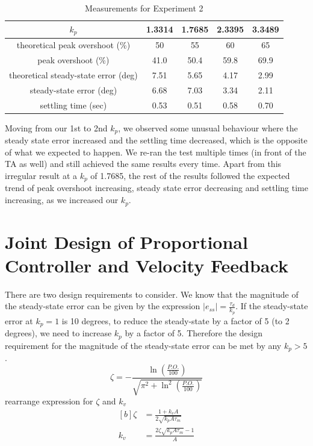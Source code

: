 \documentclass[12pt]{article}
\begin{document}

\begin{table}[h!]
\centering
\begin{tabular}{|c|c|c|c|c|} \hline
    $k_p$ & 1.3314 & 1.7685 & 2.3395 & 3.3489 \\ \hline
    theoretical peak overshoot (\%) & 50 & 55 & 60 & 65 \\ \hline
    peak overshoot (\%) & 41.0 & 50.4 & 59.8 & 69.9 \\ \hline
    theoretical steady-state error (deg) & 7.51 & 5.65 & 4.17 & 2.99 \\ \hline
    steady-state error (deg) & 6.68 & 7.03 & 3.34 & 2.11 \\ \hline
    settling time (sec) & 0.53 & 0.51 & 0.58 & 0.70 \\ \hline 
\end{tabular}
\caption{\label{table:exp2_measurements}Measurements for Experiment 2}
\end{table}

Moving from our 1st to 2nd $k_p$, we observed some unusual behaviour where the steady state error increased and the settling time decreased, which is the opposite of what we expected to happen. We re-ran the test multiple times (in front of the TA as well) and still achieved the same results every time. Apart from this irregular result at a $k_p$ of 1.7685, the rest of the results followed the expected trend of peak overshoot increasing, steady state error decreasing and settling time increasing, as we increased our $k_p$.
\setcounter{section}{5}
\section{Joint Design of Proportional Controller and Velocity Feedback}
There are two design requirements to consider. We know that the magnitude of the steady-state error can be given by the expression $\left| e_{ss} \right| = \frac{\tau_d}{k_p}$. If the steady-state error at $k_p = 1$ is 10 degrees, to reduce the steady-state by a factor of 5 (to 2 degrees), we need to increase $k_p$ by a factor of 5. Therefore the design requirement for the magnitude of the steady-state error can be met by any $k_p > 5$. 
\begin{equation}
    \zeta = -\frac{\ln\left(\frac{P.O.}{100}\right)}{\sqrt{\pi^2 + \ln^2\left(\frac{P.O.}{100}\right)}}
\end{equation}
rearrange expression for $\zeta$ and $k_v$
\begin{equation}
\begin{aligned}[b]
    \zeta &= \frac{1+k_vA}{2\sqrt{k_pA\tau_m}} \\
    k_v &= \frac{2\zeta\sqrt{k_pA\tau_m}-1}{A} 
\end{aligned}
\end{equation}
\end{document}
